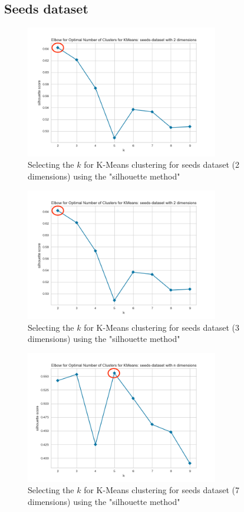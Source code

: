 \newpage
\subsection{Seeds dataset}
\begin{figure}[H]
  \includegraphics[width=0.75\textwidth]{Method/images//k-values/seeds-dataset-2-kmeans.png}
  \caption{Selecting the $k$ for K-Means clustering for seeds dataset (2 dimensions) using the "silhouette method"}
  \label{hyperparameters:agglomerative-seeds-dataset-2d}
\end{figure}
\begin{figure}[H]
  \includegraphics[width=0.75\textwidth]{Method/images/k-values/seeds-dataset-2-kmeans.png}
  \caption{Selecting the $k$ for K-Means clustering for seeds dataset (3 dimensions) using the "silhouette method"}
  \label{hyperparameters:agglomerative-seeds-dataset-3d}
\end{figure}
\begin{figure}[H]
  \includegraphics[width=0.75\textwidth]{Method/images/k-values/seeds-dataset-n-kmeans.png}
  \caption{Selecting the $k$ for K-Means clustering for seeds dataset (7 dimensions) using the "silhouette method"}
  \label{hyperparameters:agglomerative-seeds-dataset-7d}
\end{figure}
\newpage


